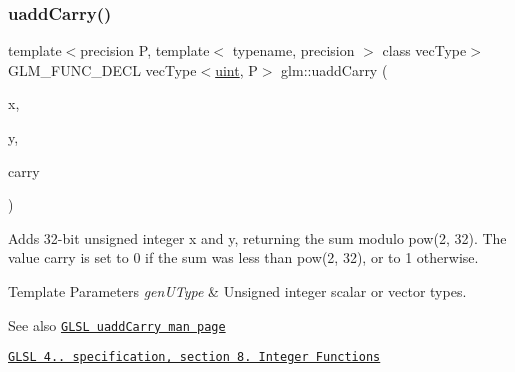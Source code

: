 \subsubsection{\texorpdfstring{uadd\+Carry()}{uaddCarry()}}
{\footnotesize\ttfamily template$<$precision P, template$<$ typename, precision $>$ class vec\+Type$>$ \\
G\+L\+M\+\_\+\+F\+U\+N\+C\+\_\+\+D\+E\+CL vec\+Type$<$\hyperlink{group__core__precision_ga4fd29415871152bfb5abd588334147c8}{uint}, P$>$ glm\+::uadd\+Carry (\begin{DoxyParamCaption}\item[{vec\+Type$<$ \hyperlink{group__core__precision_ga4fd29415871152bfb5abd588334147c8}{uint}, P $>$ const \&}]{x,  }\item[{vec\+Type$<$ \hyperlink{group__core__precision_ga4fd29415871152bfb5abd588334147c8}{uint}, P $>$ const \&}]{y,  }\item[{vec\+Type$<$ \hyperlink{group__core__precision_ga4fd29415871152bfb5abd588334147c8}{uint}, P $>$ \&}]{carry }\end{DoxyParamCaption})}

Adds 32-\/bit unsigned integer x and y, returning the sum modulo pow(2, 32). The value carry is set to 0 if the sum was less than pow(2, 32), or to 1 otherwise.


\begin{DoxyTemplParams}{Template Parameters}
{\em gen\+U\+Type} & Unsigned integer scalar or vector types.\\
\hline
\end{DoxyTemplParams}
\begin{DoxySeeAlso}{See also}
\href{http://www.opengl.org/sdk/docs/manglsl/xhtml/uaddCarry.xml}{\tt G\+L\+SL uadd\+Carry man page} 

\href{http://www.opengl.org/registry/doc/GLSLangSpec.4.20.8.pdf}{\tt G\+L\+SL 4.. specification, section 8. Integer Functions} 
\end{DoxySeeAlso}
\mbox{\label{group__core__func__integer_ga456ff9dcec42f6769a9ae2a2af7f1ce1}} 
